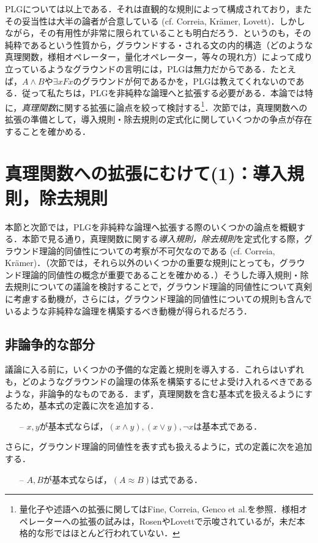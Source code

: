 \documentclass[twoside,14Q,dvipdfmx]{jsarticle}
\theoremstyle{definition}
\begin{document}
\textsc{PLG}については以上である．それは直観的な規則によって構成されており，またその妥当性は大半の論者が合意している (cf. Correia\cite{Correia2010,Correia2014,Correia2017}, Kr\"{a}mer\cite{Kramer2018,Kramer2021}, Lovett\cite{Lovett2020})．しかしながら，その有用性が非常に限られていることも明白だろう．というのも，その純粋であるという性質から，グラウンドする・される文の内的構造（どのような真理関数，様相オペレーター，量化オペレーター，等々の現れ方）によって成り立っているようなグラウンドの言明には，\textsc{PLG}は無力だからである．たとえば，$A\land B$や$\exists xFx$のグラウンドが何であるかを，\textsc{PLG}は教えてくれないのである．従って私たちは，\textsc{PLG}を非純粋な論理へと拡張する必要がある．本論では特に，\emph{真理関数}に関する拡張に論点を絞って検討する\footnote{量化子や述語への拡張に関してはFine\cite{Fine2012a}, Correia\cite{Correia2014}, Genco et al.\cite{Gencoetal2021}を参照．様相オペレーターへの拡張の試みは，Rosen\cite{Rosen2010}やLovett\cite{Lovett2020}で示唆されているが，未だ本格的な形ではほとんど行われていない．}．次節では，真理関数への拡張の準備として，導入規則・除去規則の定式化に関していくつかの争点が存在することを確かめる．
%
%
%
\section{真理関数への拡張にむけて(1)：導入規則，除去規則}\label{truthfunction}
本節と次節では，\textsc{PLG}を非純粋な論理へ拡張する際のいくつかの論点を概観する．本節で見る通り，真理関数に関する\emph{導入規則，除去規則}を定式化する際，グラウンド理論的同値性についての考察が不可欠なのである (cf. Correia\cite{Correia2017}, Kr\"{a}mer\cite{Kramer2018,Kramer2021})．（次節では，それら以外のいくつかの重要な規則にとっても，グラウンド理論的同値性の概念が重要であることを確かめる．）そうした導入規則・除去規則についての議論を検討することで，グラウンド理論的同値性について真剣に考慮する動機が，さらには，グラウンド理論的同値性についての規則も含んでいるような非純粋な論理を構築するべき動機が得られるだろう．

\subsection{非論争的な部分}
議論に入る前に，いくつかの予備的な定義と規則を導入する．これらはいずれも，どのようなグラウンドの論理の体系を構築するにせよ受け入れるべきであるような，非論争的なものである．まず，真理関数を含む基本式を扱えるようにするため，基本式の定義に次を追加する．
	\begin{itemize}
	\item[--] $x, y$が基本式ならば，$(x\land y), (x\lor y), \lnot x$は基本式である．
	\end{itemize}
さらに，グラウンド理論的同値性を表す式も扱えるように，式の定義に次を追加する．
	\begin{itemize}
	\item[--] $A, B$が基本式ならば，$(A\approx B)$は式である．
	\end{itemize}
\end{document}
